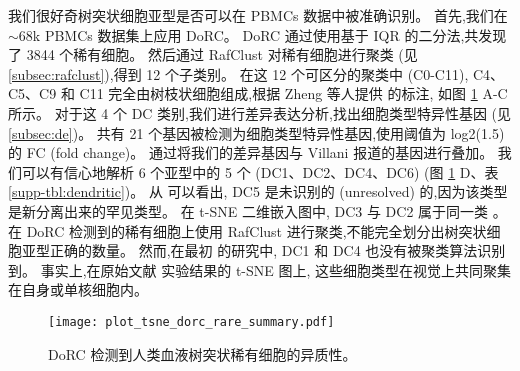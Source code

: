 我们很好奇树突状细胞亚型是否可以在 PBMCs 数据中被准确识别。
首先,我们在 ${\sim}68$k PBMCs 数据集上应用 DoRC。
DoRC 通过使用基于 IQR 的二分法,共发现了 3844 个稀有细胞。
然后通过 RafClust 对稀有细胞进行聚类 (见 \ref{subsec:rafclust}),得到 12 个子类别。
在这 12 个可区分的聚类中 (C0-C11),
C4、C5、C9 和 C11 完全由树枝状细胞组成,根据 Zheng 等人提供 的标注,
如图 \ref{fig:dorc_dendritic} A-C 所示。
对于这 4 个 DC 类别,我们进行差异表达分析,找出细胞类型特异性基因 (见 \ref{subsec:de})。
共有 21 个基因被检测为细胞类型特异性基因,使用阈值为 log2(1.5) 的 FC (fold change)。
通过将我们的差异基因与 Villani  报道的基因进行叠加。
我们可以有信心地解析 6 个亚型中的 5 个 (DC1、DC2、DC4、DC6) (图 \ref{fig:dorc_dendritic} D、表 \ref{supp-tbl:dendritic})。
从  可以看出, DC5 是未识别的 (unresolved) 的,因为该类型是新分离出来的罕见类型。
在 t-SNE 二维嵌入图中, DC3 与 DC2 属于同一类 。
在 DoRC 检测到的稀有细胞上使用 RafClust 进行聚类,不能完全划分出树突状细胞亚型正确的数量。
然而,在最初 的研究中, DC1 和 DC4 也没有被聚类算法识别到。
事实上,在原始文献  实验结果的 t-SNE 图上,
这些细胞类型在视觉上共同聚集在自身或单核细胞内。
\begin{figure}[!htbp]
    \centering
    \texttt{[image: plot\_tsne\_dorc\_rare\_summary.pdf]}
    \caption{
    DoRC 检测到人类血液树突状稀有细胞的异质性。
    }
    \label{fig:dorc_dendritic}
\end{figure}

